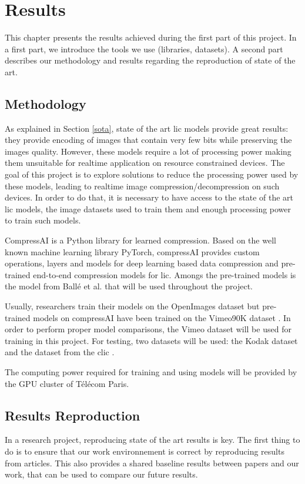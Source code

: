 \chapter{Results}
\label{results}
This chapter presents the results achieved during the first part of this project. In a first part, we introduce the tools we use (libraries, datasets). A second part describes our methodology and results regarding the reproduction of state of the art.

\section{Methodology}
As explained in Section \ref{sota}, state of the art \acrshort{lic} models provide great results: they provide encoding of images that contain very few bits while preserving the images quality. However, these models require a lot of processing power making them unsuitable for realtime application on resource constrained devices. The goal of this project is to explore solutions to reduce the processing power used by these models, leading to realtime image compression/decompression on such devices. In order to do that, it is necessary to have access to the state of the art \acrshort{lic} models, the image datasets used to train them and enough processing power to train such models.

CompressAI \cite{compressai} is a Python library for learned compression. Based on the well known machine learning library PyTorch, compressAI provides custom operations, layers and models for deep learning based data compression and pre-trained end-to-end compression models for \acrshort{lic}. Amongs the pre-trained models is the model from Ballé et al.\cite{ballemshj18} that will be used throughout the project.

Usually, researchers train their models on the OpenImages dataset \cite{openimages} but pre-trained models on compressAI have been trained on the Vimeo90K dataset \cite{xue2019video}. In order to perform proper model comparisons, the Vimeo dataset will be used for training in this project. For testing, two datasets will be used: the Kodak dataset \cite{kodak} and the dataset from the \acrfull{clic} \cite{clic}.

The computing power required for training and using models will be provided by the GPU cluster of Télécom Paris.

\section{Results Reproduction}
In a research project, reproducing state of the art results is key. The first thing to do is to ensure that our work environnement is correct by reproducing results from articles. This also provides a shared baseline results between papers and our work, that can be used to compare our future results.

